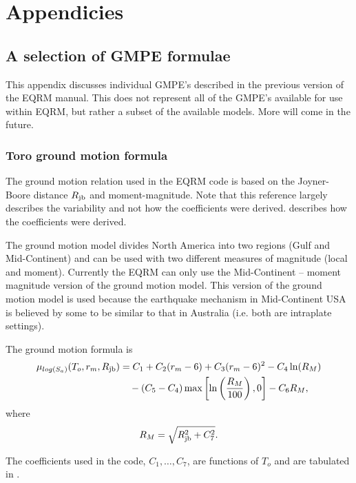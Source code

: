 \chapter{Appendicies}

\section{A selection of GMPE formulae}
\label{app:GMPE_eqns}

This appendix discusses individual GMPE's described in the previous
version of the EQRM manual.  This does not represent all of the GMPE's
available for use within EQRM, but rather a subset of the available
models. More will come in the future.


\subsection{Toro ground motion formula}

The \citet{dr_Toro97a} ground motion relation used in the EQRM code
is based on the Joyner-Boore distance $\Rjb$ and moment-magnitude.
Note that this reference largely describes the variability and not
how the coefficients were derived. \citet{dr_EPRI93a} describes
how the coefficients were derived.

The \citet{dr_Toro97a} ground motion model divides North America
into two regions (Gulf and Mid-Continent) and can  be used with
two different measures of magnitude (local and moment). Currently
the EQRM can only use the Mid-Continent -- moment magnitude
version of the ground motion model. This version of the ground motion
model is used because the earthquake mechanism in Mid-Continent
USA is believed by some to be similar to that in Australia (i.e. both are
intraplate settings).

The ground motion formula is
\begin{equation}
\begin{split}
\mu_{log(S_a)}(T_o,r_m,\Rjb) &= C_1 + C_2(r_m-6) + C_3(r_m-6)^2 - C_4\ln(R_M) \\
       &\quad  - (C_5-C_4)\max\left[\ln\left(\frac{R_M}{100}\right),0\right] -C_6R_M,
\end{split}
\end{equation}
where
\begin{equation}
 R_M = \sqrt{ \Rjb^2 + C_7^2 }.
\end{equation}

The coefficients used in the code, $C_1,\ldots,C_7$, are functions
of $T_o$ and are tabulated in \citet[Table 2]{dr_Toro97a}.

